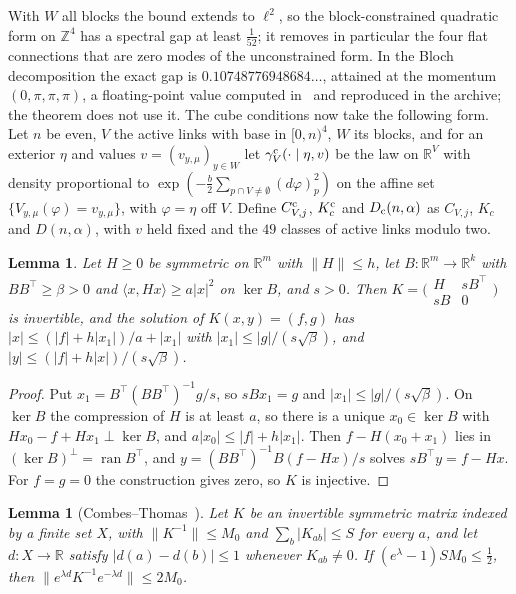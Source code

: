 \documentclass[11pt]{amsart}
\newtheorem{lemma}[theorem]{Lemma}
\theoremstyle{definition}
\theoremstyle{remark}
\numberwithin{equation}{section}
\newcommand{\R}{\mathbb{R}}
\newcommand{\Z}{\mathbb{Z}}
\begin{document}
With $W$ all blocks the bound extends to $\ell^2$, so the block-constrained
quadratic form on $\Z^4$ has a spectral gap at least $\frac1{52}$; it removes
in particular the four flat connections that are zero modes of the
unconstrained form. In the Bloch decomposition the exact gap is
$0.10748776948684\dots$, attained at the momentum $(0,\pi,\pi,\pi)$, a
floating-point value computed in~\cite{Loc26} and reproduced in the archive;
the theorem does not use it. The cube conditions now take the following
form. Let $n$ be even, $V$ the active links with base in $[0,n)^4$, $W$ its
blocks, and for an exterior $\eta$ and values $v=(v_{y,\mu})_{y\in W}$ let
$\gamma^{\rm c}_V(\cdot\mid\eta,v)$ be the law on $\R^V$ with density
proportional to $\exp(-\frac b2\sum_{p\cap V\ne\emptyset}(d\varphi)_p^2)$ on
the affine set $\{V_{y,\mu}(\varphi)=v_{y,\mu}\}$, with $\varphi=\eta$ off $V$.
Define $C^{\rm c}_{V,j}$, $K^{\rm c}_c$ and $D_{\rm c}(n,\alpha)$ as $C_{V,j}$,
$K_c$ and $D(n,\alpha)$, with $v$ held fixed and the $49$ classes of active
links modulo two.

\begin{lemma}\label{lem:saddle}
Let $H\ge0$ be symmetric on $\R^m$ with $\|H\|\le h$, let $B:\R^m\to\R^k$ with
$BB^\top\ge\beta>0$ and $\langle x,Hx\rangle\ge a|x|^2$ on $\ker B$, and
$s>0$. Then $K=\bigl(\begin{smallmatrix}H&sB^\top\\sB&0\end{smallmatrix}
\bigr)$ is invertible, and the solution of $K(x,y)=(f,g)$ has
$|x|\le(|f|+h|x_1|)/a+|x_1|$ with $|x_1|\le|g|/(s\sqrt\beta)$, and $|y|\le
(|f|+h|x|)/(s\sqrt\beta)$.
\end{lemma}

\begin{proof}
Put $x_1=B^\top(BB^\top)^{-1}g/s$, so $sBx_1=g$ and $|x_1|\le|g|/(s\sqrt
\beta)$. On $\ker B$ the compression of $H$ is at least $a$, so there is a
unique $x_0\in\ker B$ with $Hx_0-f+Hx_1\perp\ker B$, and $a|x_0|\le|f|+h
|x_1|$. Then $f-H(x_0+x_1)$ lies in $(\ker B)^\perp=\operatorname{ran}B^\top$,
and $y=(BB^\top)^{-1}B(f-Hx)/s$ solves $sB^\top y=f-Hx$. For $f=g=0$ the
construction gives zero, so $K$ is injective.
\end{proof}

\begin{lemma}[Combes--Thomas~\cite{CT73}]\label{lem:combes}
Let $K$ be an invertible symmetric matrix indexed by a finite set $X$, with
$\|K^{-1}\|\le M_0$ and $\sum_b|K_{ab}|\le S$ for every $a$, and let
$d:X\to\R$ satisfy $|d(a)-d(b)|\le1$ whenever $K_{ab}\ne0$. If $(e^\lambda-1)
SM_0\le\frac12$, then $\|e^{\lambda d}K^{-1}e^{-\lambda d}\|\le2M_0$.
\end{lemma}
\end{document}
